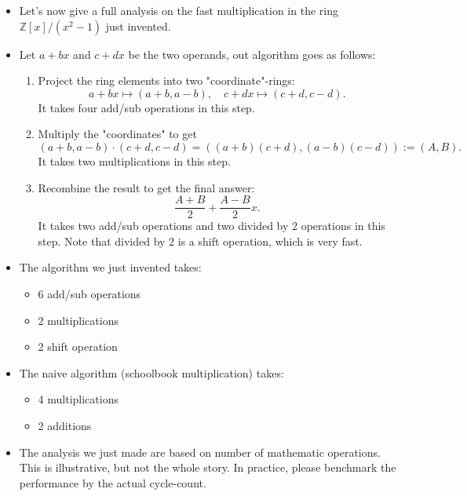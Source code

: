 \begin{frame}
    \begin{itemize}
        \item <1->Let's now give a full analysis on the fast multiplication 
            in the ring \( \mathbb{Z}[x] / (x^{2} - 1) \) just invented.
        \item <2->Let \( a + b x \) and \( c + d x \) be the two operands, 
            out algorithm goes as follows:
            \begin{enumerate}
                \item <3->Project the ring elements into two "coordinate"-rings:
                    \[
                        a + b x \mapsto (a+b, a-b),\quad c + d x \mapsto (c+d, c-d).
                    \]
                    It takes four add/sub operations in this step.
                \item <4->Multiply the "coordinates" to get
                    \[
                        (a+b, a-b) \cdot (c+d, c-d) = ((a+b)(c+d), (a-b)(c-d)) := (A,B).
                    \]
                    It takes two multiplications in this step.

                \item <5->Recombine the result to get the final answer:
                    \[
                        \frac{A+B}{2} + \frac{A-B}{2}x.
                    \]
                    It takes two add/sub operations and two divided by 2 operations in this step.
                    Note that divided by 2 is a shift operation, which is very fast.
            \end{enumerate}
    \end{itemize}
\end{frame}

\begin{frame}
    \begin{itemize}
        \item <1->The algorithm we just invented takes:
            \begin{itemize}
                \item 6 add/sub operations
                \item 2 multiplications
                \item 2 shift operation
            \end{itemize}
        \item <2->The naive algorithm (schoolbook multiplication) takes:
            \begin{itemize}
                \item 4 multiplications
                \item 2 additions
            \end{itemize}
        \item <3->The analysis we just made are based on number of mathematic operations.
            This is illustrative, but not the whole story.
            In practice, please benchmark the performance by the actual cycle-count.
    \end{itemize}
\end{frame}


